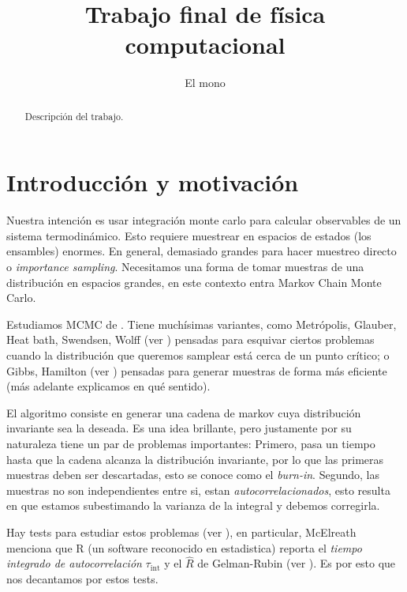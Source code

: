 \documentclass[a4paper, 12pt]{article}
\title{Trabajo final de física computacional}
\author{El mono}
\date{}
\newcommand{\tauint}{\tau_\text{int}}
\begin{document}
\maketitle

\begin{abstract}
    Descripción del trabajo.
\end{abstract}

\section{Introducción y motivación}

Nuestra intención es usar integración monte carlo para calcular observables de un sistema termodinámico. Esto requiere muestrear en espacios de estados (los ensambles) enormes. En general, demasiado grandes para hacer muestreo directo o {\it importance sampling}. Necesitamos una forma de tomar muestras de una distribución en espacios grandes, en este contexto entra Markov Chain Monte Carlo.

Estudiamos MCMC de \cite{schachinger2007mcmc, mcelreath2016statistical, klenke2007probability}. Tiene muchísimas variantes, como Metrópolis, Glauber, Heat bath, Swendsen, Wolff (ver \cite{janke2012montecarlo, metropolis1953equation}) pensadas para esquivar ciertos problemas cuando la distribución que queremos samplear está cerca de un punto crítico; o Gibbs, Hamilton (ver \cite{klenke2007probability, mcelreath2016statistical}) pensadas para generar muestras de forma más eficiente (más adelante explicamos en qué sentido).

El algoritmo consiste en generar una cadena de markov cuya distribución invariante sea la deseada. Es una idea brillante, pero justamente por su naturaleza tiene un par de problemas importantes: Primero, pasa un tiempo hasta que la cadena alcanza la distribución invariante, por lo que las primeras muestras deben ser descartadas, esto se conoce como el {\it burn-in}. Segundo, las muestras no son independientes entre si, estan {\it autocorrelacionados}, esto resulta en que estamos subestimando la varianza de la integral y debemos corregirla.

Hay tests para estudiar estos problemas (ver \cite{vivekanada2020convergence, mcelreath2016statistical, schachinger2007mcmc}), en particular, McElreath menciona que R (un software reconocido en estadistica) reporta el {\it tiempo integrado de autocorrelación} $\tauint$ y el $\hat{R}$ de Gelman-Rubin (ver \cite{gelman1992inference}). Es por esto que nos decantamos por estos tests.
\end{document}
